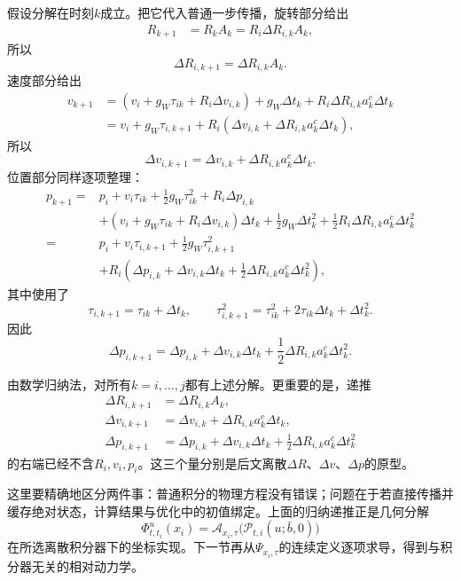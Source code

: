 假设分解在时刻$k$成立。把它代入普通一步传播，旋转部分给出
\[
\begin{aligned}
    R_{k+1}
    &=R_kA_k
     =R_i\Delta R_{i,k}A_k,
\end{aligned}
\]
所以
\[
    \Delta R_{i,k+1}=\Delta R_{i,k}A_k.
\]
速度部分给出
\[
\begin{aligned}
    v_{k+1}
    &=(v_i+g_W\tau_{ik}+R_i\Delta v_{i,k})
      +g_W\Delta t_k
      +R_i\Delta R_{i,k}a_k^c\Delta t_k\\
    &=v_i+g_W\tau_{i,k+1}
      +R_i\left(
        \Delta v_{i,k}+\Delta R_{i,k}a_k^c\Delta t_k
      \right),
\end{aligned}
\]
所以
\[
    \Delta v_{i,k+1}
    =\Delta v_{i,k}+\Delta R_{i,k}a_k^c\Delta t_k.
\]
位置部分同样逐项整理：
\[
\begin{aligned}
    p_{k+1}
    ={}&p_i+v_i\tau_{ik}
      +\frac12g_W\tau_{ik}^2+R_i\Delta p_{i,k}\\
      &+(v_i+g_W\tau_{ik}+R_i\Delta v_{i,k})\Delta t_k
      +\frac12g_W\Delta t_k^2
      +\frac12R_i\Delta R_{i,k}a_k^c\Delta t_k^2\\
    ={}&p_i+v_i\tau_{i,k+1}
      +\frac12g_W\tau_{i,k+1}^2\\
      &+R_i\left(
        \Delta p_{i,k}+\Delta v_{i,k}\Delta t_k
        +\frac12\Delta R_{i,k}a_k^c\Delta t_k^2
      \right),
\end{aligned}
\]
其中使用了
\[
    \tau_{i,k+1}=\tau_{ik}+\Delta t_k,
    \qquad
    \tau_{i,k+1}^2
    =\tau_{ik}^2+2\tau_{ik}\Delta t_k+\Delta t_k^2.
\]
因此
\[
    \Delta p_{i,k+1}
    =\Delta p_{i,k}+\Delta v_{i,k}\Delta t_k
      +\frac12\Delta R_{i,k}a_k^c\Delta t_k^2.
\]

由数学归纳法，对所有$k=i,\ldots,j$都有上述分解。更重要的是，递推
\[
\boxed{
\begin{aligned}
    \Delta R_{i,k+1}
    &=\Delta R_{i,k}A_k,\\
    \Delta v_{i,k+1}
    &=\Delta v_{i,k}+\Delta R_{i,k}a_k^c\Delta t_k,\\
    \Delta p_{i,k+1}
    &=\Delta p_{i,k}+\Delta v_{i,k}\Delta t_k
      +\frac12\Delta R_{i,k}a_k^c\Delta t_k^2
\end{aligned}
}
\]
的右端已经不含$R_i,v_i,p_i$。这三个量分别是后文离散$\Delta R$、$\Delta v$、$\Delta p$的原型。

这里要精确地区分两件事：普通积分的物理方程没有错误；问题在于若直接传播并缓存绝对状态，计算结果与优化中的初值绑定。上面的归纳递推正是几何分解
\[
    \Phi^u_{t,t_i}(x_i)
    =\mathcal A_{x_i,\tau}
      \bigl(\mathcal P_{t,i}(u;\bar b,0)\bigr)
\]
在所选离散积分器下的坐标实现。下一节再从$\Psi_{x_i,\tau}$的连续定义逐项求导，得到与积分器无关的相对动力学。

